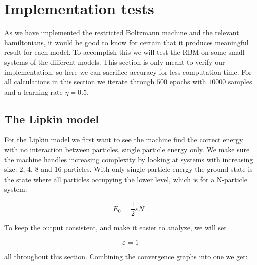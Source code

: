 \section{Implementation tests}

As we have implemented the restricted Boltzmann machine and the relevant hamiltonians, it would be good to know for certain that it produces meaningful result for each model. To accomplish this we will test the RBM on some small systems of the different models. This section is only meant to verify our implementation, so here we can sacrifice accuracy for less computation time. For all calculations in this section we iterate through $500$ epochs with $10000$ samples and a learning rate $\eta = 0.5$.

\subsection{The Lipkin model}

For the Lipkin model we first want to see the machine find the correct energy with no interaction between particles, single particle energy only. We make sure the machine handles increasing complexity by looking at systems with increasing size: $2$, $4$, $8$ and $16$ particles. With only single particle energy the ground state is the state where all particles occupying the lower level, which is for a N-particle system:

\begin{equation}
  E_0 = \frac{1}{2}\varepsilon N \; .
  \label{eq:Test_lipkin_single}
\end{equation}

To keep the output consistent, and make it easier to analyze, we will set

$$\varepsilon = 1$$

all throughout this section. Combining the convergence graphs into one we get:

